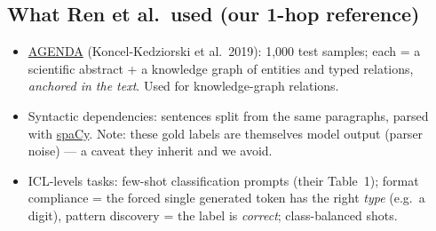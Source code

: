 \documentclass[11pt]{article}
\begin{document}
\subsection{What Ren et al.\ used (our 1-hop reference)}
\begin{itemize}[itemsep=2pt]
  \item \href{https://github.com/rikdz/GraphWriter}{AGENDA} (Koncel-Kedziorski et al.\ 2019): 1{,}000 test samples; each = a scientific abstract + a knowledge graph of entities and typed relations, \emph{anchored in the text}. Used for knowledge-graph relations.
  \item Syntactic dependencies: sentences split from the same paragraphs, parsed with \href{https://spacy.io}{spaCy}. Note: these gold labels are themselves model output (parser noise) --- a caveat they inherit and we avoid.
  \item ICL-levels tasks: few-shot classification prompts (their Table~1); format compliance = the forced single generated token has the right \emph{type} (e.g.\ a digit), pattern discovery = the label is \emph{correct}; class-balanced shots.
\end{itemize}
\end{document}
